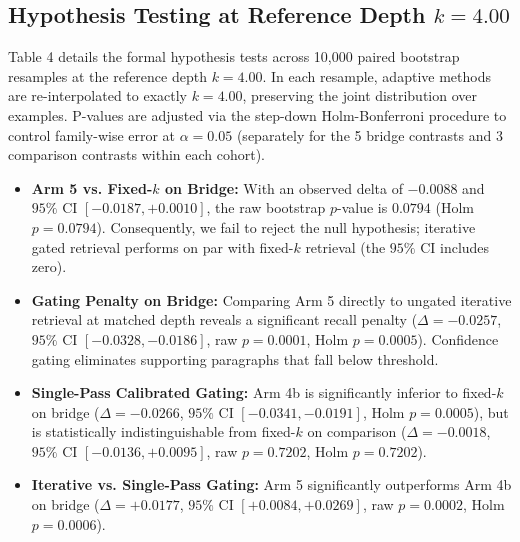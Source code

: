 \documentclass{article}
\begin{document}
\subsection{Hypothesis Testing at Reference Depth $k=4.00$}
Table 4 details the formal hypothesis tests across 10,000 paired bootstrap resamples at the reference depth $k=4.00$. In each resample, adaptive methods are re-interpolated to exactly $k=4.00$, preserving the joint distribution over examples. P-values are adjusted via the step-down Holm-Bonferroni procedure to control family-wise error at $\alpha = 0.05$ (separately for the 5 bridge contrasts and 3 comparison contrasts within each cohort).
\begin{itemize}
    \item \textbf{Arm 5 vs. Fixed-$k$ on Bridge:} With an observed delta of $-0.0088$ and $95\%$ CI $[-0.0187, +0.0010]$, the raw bootstrap $p$-value is $0.0794$ (Holm $p = 0.0794$). Consequently, we fail to reject the null hypothesis; iterative gated retrieval performs on par with fixed-$k$ retrieval (the $95\%$ CI includes zero).
    \item \textbf{Gating Penalty on Bridge:} Comparing Arm 5 directly to ungated iterative retrieval at matched depth reveals a significant recall penalty ($\Delta = -0.0257$, $95\%$ CI $[-0.0328, -0.0186]$, raw $p = 0.0001$, Holm $p = 0.0005$). Confidence gating eliminates supporting paragraphs that fall below threshold.
    \item \textbf{Single-Pass Calibrated Gating:} Arm 4b is significantly inferior to fixed-$k$ on bridge ($\Delta = -0.0266$, $95\%$ CI $[-0.0341, -0.0191]$, Holm $p = 0.0005$), but is statistically indistinguishable from fixed-$k$ on comparison ($\Delta = -0.0018$, $95\%$ CI $[-0.0136, +0.0095]$, raw $p = 0.7202$, Holm $p = 0.7202$).
    \item \textbf{Iterative vs. Single-Pass Gating:} Arm 5 significantly outperforms Arm 4b on bridge ($\Delta = +0.0177$, $95\%$ CI $[+0.0084, +0.0269]$, raw $p = 0.0002$, Holm $p = 0.0006$).
\end{itemize}
\end{document}
